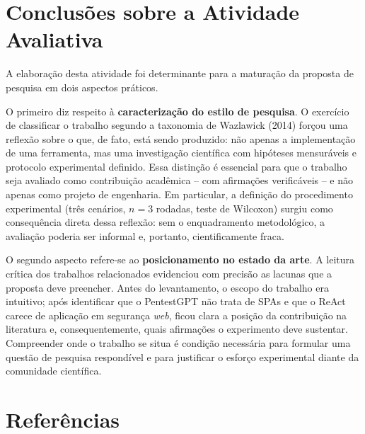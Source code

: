 \documentclass[12pt, a4paper]{article}
\begin{document}
\section{Conclusões sobre a Atividade Avaliativa}

A elaboração desta atividade foi determinante para a maturação da proposta de pesquisa em dois aspectos práticos.

O primeiro diz respeito à \textbf{caracterização do estilo de pesquisa}.
O exercício de classificar o trabalho segundo a taxonomia de Wazlawick (2014) forçou uma reflexão sobre o que, de fato, está sendo produzido: não apenas a implementação de uma ferramenta, mas uma investigação científica com hipóteses mensuráveis e protocolo experimental definido.
Essa distinção é essencial para que o trabalho seja avaliado como contribuição acadêmica -- com afirmações verificáveis -- e não apenas como projeto de engenharia.
Em particular, a definição do procedimento experimental (três cenários, $n = 3$ rodadas, teste de Wilcoxon) surgiu como consequência direta dessa reflexão: sem o enquadramento metodológico, a avaliação poderia ser informal e, portanto, cientificamente fraca.

O segundo aspecto refere-se ao \textbf{posicionamento no estado da arte}.
A leitura crítica dos trabalhos relacionados evidenciou com precisão as lacunas que a proposta deve preencher.
Antes do levantamento, o escopo do trabalho era intuitivo; após identificar que o PentestGPT não trata de SPAs e que o ReAct carece de aplicação em segurança \textit{web}, ficou clara a posição da contribuição na literatura e, consequentemente, quais afirmações o experimento deve sustentar.
Compreender onde o trabalho se situa é condição necessária para formular uma questão de pesquisa respondível e para justificar o esforço experimental diante da comunidade científica.

\section{Referências}
\end{document}
